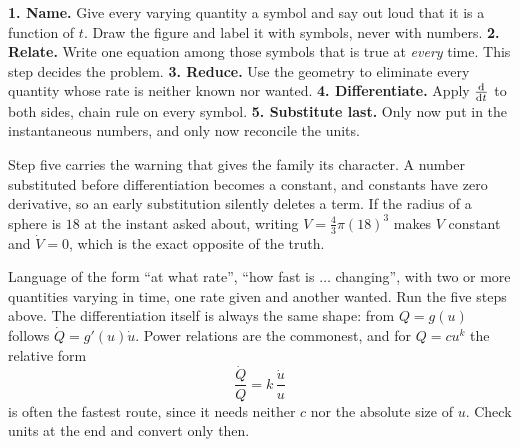 \begin{keynote}
\textbf{1. Name.} Give every varying quantity a symbol and say out loud that it is a function of $t$. Draw the figure and label it with symbols, never with numbers. \textbf{2. Relate.} Write one equation among those symbols that is true at \emph{every} time. This step decides the problem. \textbf{3. Reduce.} Use the geometry to eliminate every quantity whose rate is neither known nor wanted. \textbf{4. Differentiate.} Apply $\frac{\mathrm{d}}{\mathrm{d}t}$ to both sides, chain rule on every symbol. \textbf{5. Substitute last.} Only now put in the instantaneous numbers, and only now reconcile the units.
\end{keynote}

Step five carries the warning that gives the family its character. A number substituted before differentiation becomes a constant, and constants have zero derivative, so an early substitution silently deletes a term. If the radius of a sphere is $18$ at the instant asked about, writing $V=\tfrac43\pi(18)^{3}$ makes $V$ constant and $\dot V=0$, which is the exact opposite of the truth.

\cue Language of the form ``at what rate'', ``how fast is $\ldots$ changing'', with two or more quantities varying in time, one rate given and another wanted.
\method Run the five steps above. The differentiation itself is always the same shape: from $Q=g(u)$ follows $\dot Q=g'(u)\dot u$. Power relations are the commonest, and for $Q=cu^{k}$ the relative form
\[
\frac{\dot Q}{Q}=k\,\frac{\dot u}{u}
\]
is often the fastest route, since it needs neither $c$ nor the absolute size of $u$. Check units at the end and convert only then.

